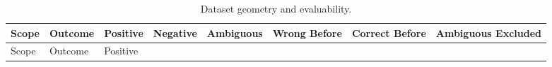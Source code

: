 \documentclass[
]{article}
\begin{document}
\begin{longtable}[]{@{}
  >{\raggedright\arraybackslash}p{}
  >{\raggedright\arraybackslash}p{}
  >{\raggedleft\arraybackslash}p{}
  >{\raggedleft\arraybackslash}p{}
  >{\raggedleft\arraybackslash}p{}
  >{\raggedleft\arraybackslash}p{}
  >{\raggedleft\arraybackslash}p{}
  >{\raggedleft\arraybackslash}p{}@{}}
\caption{Dataset geometry and evaluability.}\tabularnewline
\toprule\noalign{}
\begin{minipage}[b]{\linewidth}\raggedright
Scope
\end{minipage} & \begin{minipage}[b]{\linewidth}\raggedright
Outcome
\end{minipage} & \begin{minipage}[b]{\linewidth}\raggedleft
Positive
\end{minipage} & \begin{minipage}[b]{\linewidth}\raggedleft
Negative
\end{minipage} & \begin{minipage}[b]{\linewidth}\raggedleft
Ambiguous
\end{minipage} & \begin{minipage}[b]{\linewidth}\raggedleft
Wrong Before
\end{minipage} & \begin{minipage}[b]{\linewidth}\raggedleft
Correct Before
\end{minipage} & \begin{minipage}[b]{\linewidth}\raggedleft
Ambiguous Excluded
\end{minipage} \\
\midrule\noalign{}
\endfirsthead
\toprule\noalign{}
\begin{minipage}[b]{\linewidth}\raggedright
Scope
\end{minipage} & \begin{minipage}[b]{\linewidth}\raggedright
Outcome
\end{minipage} & \begin{minipage}[b]{\linewidth}\raggedleft
Positive
\end{minipage} & \begin{minipage}[b]{\linewidth}\raggedleft

\end{minipage}
\end{longtable}
\end{document}
